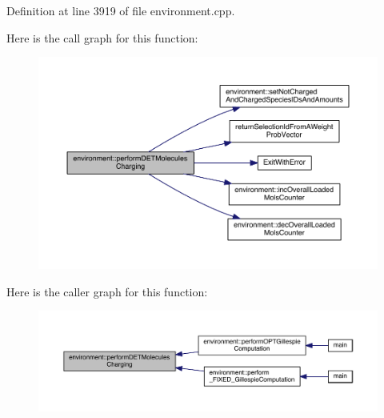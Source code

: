 Definition at line 3919 of file environment.\+cpp.



Here is the call graph for this function\+:\nopagebreak
\begin{figure}[H]
\begin{center}
\leavevmode
\includegraphics[width=350pt]{a00013_adbaf165a12edd62c614a455544807ea3_cgraph}
\end{center}
\end{figure}




Here is the caller graph for this function\+:\nopagebreak
\begin{figure}[H]
\begin{center}
\leavevmode
\includegraphics[width=350pt]{a00013_adbaf165a12edd62c614a455544807ea3_icgraph}
\end{center}
\end{figure}


